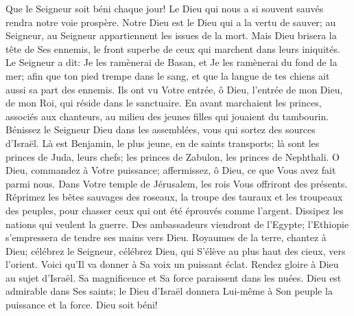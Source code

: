 {\VERSE Que le Seigneur soit béni chaque jour! Le Dieu qui nous a si souvent sauvés rendra notre voie prospère. \EVERSE
\VERSE Notre Dieu est le Dieu qui a la vertu de sauver; au Seigneur, au Seigneur appartiennent les issues de la mort. \EVERSE
\VERSE Mais Dieu brisera la tête de Ses ennemis, le front superbe de ceux qui marchent dans leurs iniquités. \EVERSE
\VERSE Le Seigneur a dit: Je les ramènerai de Basan, et Je les ramènerai du fond de la mer; \EVERSE
\VERSE afin que ton pied trempe dans le sang, et que la langue de tes chiens ait aussi sa part des ennemis. \EVERSE
\VERSE Ils ont vu Votre entrée, ô Dieu, l'entrée de mon Dieu, de mon Roi, qui réside dans le sanctuaire. \EVERSE
\VERSE En avant marchaient les princes, associés aux chanteurs, au milieu des jeunes filles qui jouaient du tambourin. \EVERSE
\VERSE Bénissez le Seigneur Dieu dans les assemblées, vous qui sortez des sources d'Israël. \EVERSE
\VERSE Là est Benjamin, le plus jeune, en de saints transports; là sont les princes de Juda, leurs chefs; les princes de Zabulon, les princes de Nephthali. \EVERSE
\VERSE O Dieu, commandez à Votre puissance; affermissez, ô Dieu, ce que Vous avez fait parmi nous. \EVERSE
\VERSE Dans Votre temple de Jérusalem, les rois Vous offriront des présents. \EVERSE
\VERSE Réprimez les bêtes sauvages des roseaux, la troupe des tauraux et les troupeaux des peuples, pour chasser ceux qui ont été éprouvés comme l'argent. Dissipez les nations qui veulent la guerre. \EVERSE
\VERSE Des ambassadeurs viendront de l'Egypte; l'Ethiopie s'empressera de tendre ses mains vers Dieu. \EVERSE
\VERSE Royaumes de la terre, chantez à Dieu; célébrez le Seigneur, célébrez Dieu, \EVERSE
\VERSE qui S'élève au plus haut des cieux, vers l'orient. Voici qu'Il va donner à Sa voix un puissant éclat. \EVERSE
\VERSE Rendez gloire à Dieu au sujet d'Israël. Sa magnificence et Sa force paraissent dans les nuées. \EVERSE
\VERSE Dieu est admirable dans Ses saints; le Dieu d'Israël donnera Lui-même à Son peuple la puissance et la force. Dieu soit béni!

}
